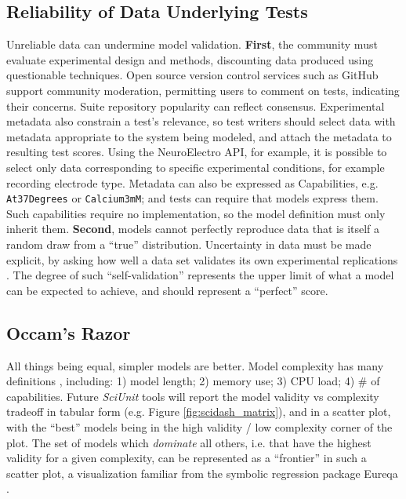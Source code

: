 \documentclass{frontiersSCNS}
\let\verbx\lstinline
\begin{document}
\subsection{Reliability of Data Underlying Tests}
Unreliable data can undermine model validation. 
\textbf{First}, the community must evaluate experimental design and methods, discounting data produced using questionable techniques. 
Open source version control services such as GitHub support community moderation, permitting users to comment on tests, indicating their concerns. 
Suite repository popularity can reflect consensus. 
Experimental metadata also constrain a test's relevance, so test writers should select data with metadata appropriate to the system being modeled, and attach the metadata to resulting test scores. Using the NeuroElectro API, for example, it is possible to select only data corresponding to specific experimental conditions, for example recording electrode type.  
Metadata can also be expressed as Capabilities, e.g. \verbx{At37Degrees} or \verbx{Calcium3mM}; and tests can require that models express them. 
Such capabilities require no implementation, so the model definition must only inherit them. 
\textbf{Second}, models cannot perfectly reproduce data that is itself a random draw from a ``true'' distribution. 
Uncertainty in data must be made explicit, by asking how well a data set validates its own experimental replications \citep{kriegeskorte_representational_2008}. 
The degree of such ``self-validation'' represents the upper limit of what a model can be expected to achieve, and should represent a ``perfect'' score.  

\subsection{Occam's Razor}
All things being equal, simpler models are better. 
Model complexity has many definitions \citep{mccabe_complexity_1976}, including: 
1) model length; 2) memory use; 3) CPU load; 4) \# of capabilities. 
Future \textit{SciUnit} tools will report the model validity vs complexity tradeoff in tabular form (e.g. Figure \ref{fig:scidash_matrix}), and in a scatter plot, with the ``best'' models being in the high validity / low complexity corner of the plot. 
The set of models which \textit{dominate} all others, i.e. that have the highest validity for a given complexity, can be represented as a ``frontier'' in such a scatter plot, a visualization familiar from the symbolic regression package Eureqa \citep{schmidt_distilling_2009}.  
\end{document}
